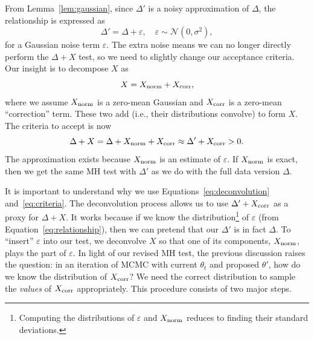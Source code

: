 \documentclass{article}
\begin{document}
From Lemma~\ref{lem:gaussian}, since $\Delta'$ is a noisy approximation of $\Delta$, the
relationship is expressed as
\begin{equation}\label{eq:relationship}
\Delta' = \Delta + \varepsilon, \quad \varepsilon \sim \mathcal{N}(0, \sigma^2),
\end{equation}
for a Gaussian noise term $\varepsilon$.  The extra noise means we can no longer directly perform
the $\Delta + X$ test, so we need to slightly change our acceptance criteria. Our insight is to
decompose $X$ as
\begin{equation}\label{eq:deconvolution}
X = X_{\rm norm}+X_{\rm corr},
\end{equation}
where we assume $X_{\rm norm}$ is a zero-mean Gaussian and $X_{\rm corr}$ is a zero-mean
``correction'' term.  These two add (i.e., their distributions convolve) to form $X$. The criteria
to accept is now
\begin{equation}\label{eq:criteria}
\Delta + X = \Delta + X_{\rm norm} + X_{\rm corr} \approx \Delta' + X_{\rm corr} >0.
\end{equation}
The approximation exists because $X_{\rm norm}$ is an estimate of $\varepsilon$. If $X_{\rm norm}$
is exact, then we get the same MH test with $\Delta'$ as we do with the full data version $\Delta$.

It is important to understand why we use Equations~\ref{eq:deconvolution} and~\ref{eq:criteria}. The
deconvolution process allows us to use $\Delta' + X_{\rm corr}$ as a proxy for $\Delta + X$. It
works because if we know the distribution\footnote{Computing the distributions of $\varepsilon$ and
$X_{\rm norm}$ reduces to finding their standard deviations.} of $\varepsilon$ (from
Equation~\ref{eq:relationship}), then we can pretend that our $\Delta'$ is in fact $\Delta$. To
``insert'' $\varepsilon$ into our test, we deconvolve $X$ so that one of its components, $X_{\rm
norm}$, plays the part of $\varepsilon$. In light of our revised MH test, the previous discussion
raises the question: in an iteration of MCMC with current $\theta_t$ and proposed $\theta'$, how do
we know the distribution of $X_{\rm corr}$? We need the correct distribution to sample the
\emph{values} of $X_{\rm corr}$ appropriately. This procedure consists of two major steps.
\end{document}
